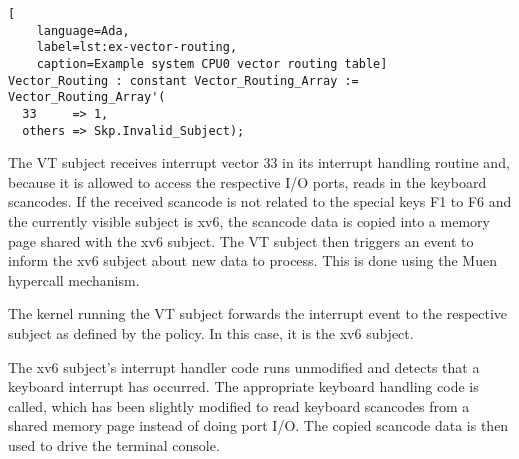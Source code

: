 \begin{lstlisting}[
	language=Ada,
	label=lst:ex-vector-routing,
	caption=Example system CPU0 vector routing table]
Vector_Routing : constant Vector_Routing_Array := Vector_Routing_Array'(
  33     => 1,
  others => Skp.Invalid_Subject);
\end{lstlisting}

The VT subject receives interrupt vector 33 in its interrupt handling routine
and, because it is allowed to access the respective I/O ports, reads in the
keyboard scancodes. If the received scancode is not related to the special keys
F1 to F6 and the currently visible subject is xv6, the scancode data is copied
into a memory page shared with the xv6 subject. The VT subject then triggers an
event to inform the xv6 subject about new data to process. This is done using
the Muen hypercall mechanism.

The kernel running the VT subject forwards the interrupt event to the respective
subject as defined by the policy. In this case, it is the xv6 subject.

The xv6 subject's interrupt handler code runs unmodified and detects that a
keyboard interrupt has occurred. The appropriate keyboard handling code is
called, which has been slightly modified to read keyboard scancodes from a
shared memory page instead of doing port I/O. The copied scancode data is then
used to drive the terminal console.
